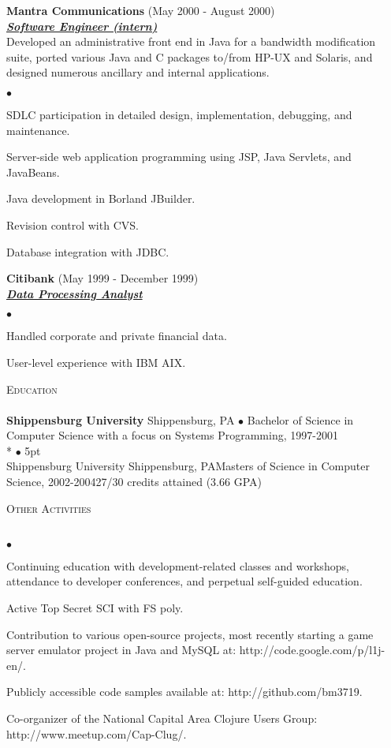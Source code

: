 \documentclass{article}
\newcommand{\lineunder}{\vspace*{-8pt} \\ \hspace*{-18pt} \hrulefill \\}
\newcommand{\header}[1]{{\hspace*{-15pt}\vspace*{7pt} \textsc{#1}} \vspace*{-7pt} \lineunder}
\newcommand{\employer}[3]{{ \textbf{#1} (#2)\\ \underline{\textbf{\emph{#3}}}\\  }}
\newenvironment{achievements}{\begin{list}{$\bullet$}{\topsep 0pt \itemsep
      -2pt}}{\vspace*{4pt}\end{list}}
\newcommand{\schoolwithcourses}[4]{
\textbf{#1} #2 $\bullet$ #3\\
#4
\vspace*{5pt}
}
\begin{document}
\employer{Mantra Communications}{May 2000 - August 2000}{Software Engineer
  (intern)} Developed an administrative front end in Java for a bandwidth
modification suite, ported various Java and C packages to/from HP-UX and
Solaris, and designed numerous ancillary and internal applications.
\begin{achievements}
\item SDLC participation in detailed design, implementation, debugging, and
  maintenance.
\item Server-side web application programming using JSP, Java Servlets, and
  JavaBeans.
\item Java development in Borland JBuilder.
\item Revision control with CVS.
\item Database integration with JDBC.
\end{achievements}

\employer{Citibank}{May 1999 - December 1999}{Data Processing Analyst}
\begin{achievements}
\item Handled corporate and private financial data.
\item User-level experience with IBM AIX.
\end{achievements}

\header{Education}

\schoolwithcourses{Shippensburg University}{Shippensburg, PA}{Bachelor of
  Science in Computer Science with a focus on Systems Programming, 1997-2001}

\schoolwithcourses{Shippensburg University}{Shippensburg, PA}{Masters of
  Science in Computer Science, 2002-2004}{27/30 credits attained (3.66 GPA)}

\header{Other Activities}
\begin{achievements}
\item Continuing education with development-related classes and workshops,
  attendance to developer conferences, and perpetual self-guided education.
\item Active Top Secret SCI with FS poly.
\item Contribution to various open-source projects, most recently starting a
  game server emulator project in Java and MySQL at:
  http://code.google.com/p/l1j-en/.
\item Publicly accessible code samples available at: http://github.com/bm3719.
\item Co-organizer of the National Capital Area Clojure Users Group:
  http://www.meetup.com/Cap-Clug/.
\end{achievements}
\end{document}
